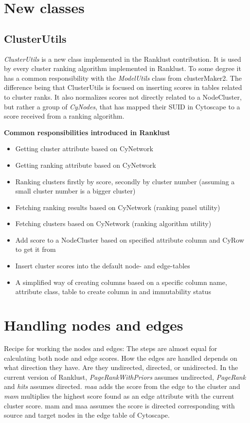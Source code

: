 \section{New classes}
\subsection{ClusterUtils}
\textit{ClusterUtils} is a new class implemented in the Ranklust contribution.
It is used by every cluster ranking algorithm implemented in Ranklust. To some
degree it has a common responsibility with the \textit{ModelUtils} class from
clusterMaker2. The difference being that ClusterUtils is focused on inserting
scores in tables related to cluster ranks. It also normalizes scores not
directly related to a NodeCluster, but rather a group of \textit{CyNodes}, that
has mapped their SUID in Cytoscape to a score received from a ranking algorithm.

\textbf{Common responsibilities introduced in Ranklust}

\begin{itemize}
    \item Getting cluster attribute based on CyNetwork
    \item Getting ranking attribute based on CyNetwork
    \item Ranking clusters firstly by score, secondly by cluster number
        (assuming a small cluster number is a bigger cluster)
    \item Fetching ranking results based on CyNetwork (ranking panel utility)
    \item Fetching clusters based on CyNetwork (ranking algorithm utility)
    \item Add score to a NodeCluster based on specified attribute column and
        CyRow to get it from
    \item Insert cluster scores into the default node- and edge-tables
    \item A simplified way of creating columns based on a specific column name,
        attribute class, table to create column in and immutability status
\end{itemize}

\section{Handling nodes and edges}
Recipe for working the nodes and edges: The steps are almost equal for
calculating both node and edge scores. How the edges are handled depends on what
direction they have. Are they undirected, directed, or unidirected. In the
current version of Ranklust, \textit{PageRankWithPriors} assumes undirected,
\textit{PageRank} and \textit{\gls{hits}} assumes directed. \textit{\gls{maa}} adds the
score from the edge to the cluster and \textit{\gls{mam}} multiplies the highest score
found as an edge attribute with the current cluster score. \gls{mam} and \gls{maa} assumes
the score is directed corresponding with source and target nodes in the edge
table of Cytoscape.

